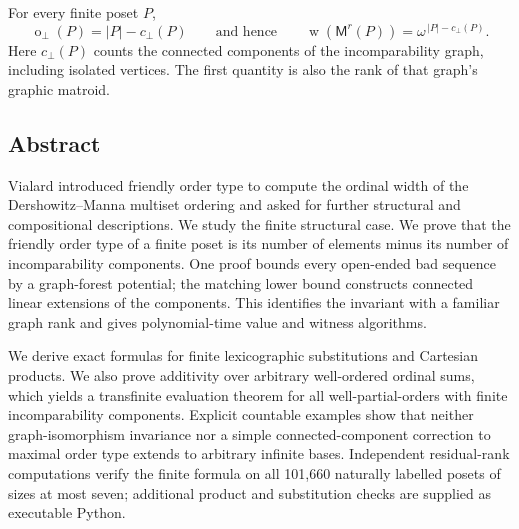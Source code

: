 \documentclass[11pt,a4paper]{article}
\theoremstyle{definition}
\theoremstyle{remark}
\newcommand{\fot}{\operatorname{o}_{\perp}}
\newcommand{\wid}{\operatorname{w}}
\newcommand{\cc}{c_{\perp}}
\newcommand{\Mr}{\mathsf{M}^{r}}
\begin{document}
\thispagestyle{empty}
\vspace{1.1cm}

\vspace{0.5cm}

\vspace{0.7cm}

\begin{resultbox}
For every finite poset $P$,
\[
\boxed{\fot(P)=|P|-\cc(P)}
\qquad\text{and hence}\qquad
\boxed{\wid(\Mr(P))=\omega^{\,|P|-\cc(P)}}.
\]
Here $\cc(P)$ counts the connected components of the incomparability graph,
including isolated vertices. The first quantity is also the rank of that
graph's graphic matroid.
\end{resultbox}

\subsection*{Abstract}
Vialard introduced friendly order type to compute the ordinal width of the
Dershowitz--Manna multiset ordering and asked for further structural and
compositional descriptions. We study the finite structural case. We prove
that the friendly order type of a finite poset is its number of elements
minus its number of incomparability components. One proof bounds every
open-ended bad sequence by a graph-forest potential; the matching lower
bound constructs connected linear extensions of the components. This
identifies the invariant with a familiar graph rank and gives polynomial-time
value and witness algorithms.

We derive exact formulas for finite lexicographic substitutions and Cartesian
products. We also prove additivity over arbitrary well-ordered ordinal sums,
which yields a transfinite evaluation theorem for all well-partial-orders
with finite incomparability components. Explicit countable examples show
that neither graph-isomorphism invariance nor a simple connected-component
correction to maximal order type extends to arbitrary infinite bases.
Independent residual-rank computations verify the finite formula on all
101,660 naturally labelled posets of sizes at most seven; additional product
and substitution checks are supplied as executable Python.
\end{document}
